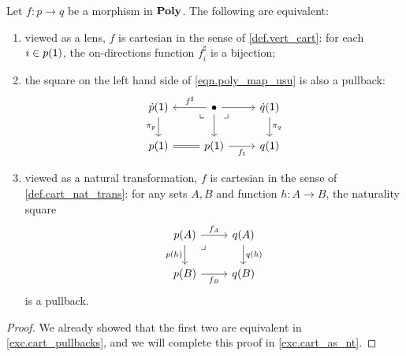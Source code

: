 \documentclass[Book-Poly]{subfiles}
\begin{document}
\begin{proposition}\label{prop.cart_as_nt}
Let $f\colon p\to q$ be a morphism in $\mathbf{Poly}$. The following are equivalent:
	\begin{enumerate}
		\item viewed as a lens, $f$ is cartesian in the sense of \cref{def.vert_cart}: for each $i\in p(\textsf{1})$, the on-directions function $f^\sharp_i$ is a bijection;
		\item the square on the left hand side of \eqref{eqn.poly_map_usu} is also a pullback:
\[
\begin{tikzcd}
	\dot{p}(\1)\ar[d, "\pi_p"']&
	\bullet\ar[l, "f^\sharp"']\ar[r]\ar[d]&
	\dot{q}(\1)\ar[d, "\pi_q"]\\
	p(\1)\ar[r, equal]\ar[ur, phantom, very near end, "\llcorner"]&
	p(\1)\ar[r, "f_\1"']&
	q(\1)\ar[ul, phantom, very near end, "\lrcorner"]
\end{tikzcd}
\]
		\item viewed as a natural transformation, $f$ is cartesian in the sense of \cref{def.cart_nat_trans}: for any sets $A,B$ and function $h\colon A\to B$, the naturality square
\begin{equation} \label{eqn.cart_nt_pullback}
\begin{tikzcd}
	p(A)\ar[r, "f_A"]\ar[d, "p(h)"']&
	q(A)\ar[d, "q(h)"]\\
	p(B)\ar[r, "f_B"']&
	q(B)\ar[ul, phantom, very near end, "\lrcorner"]
\end{tikzcd}
\end{equation}
is a pullback.
  \end{enumerate}
\end{proposition}
\begin{proof}
We already showed that the first two are equivalent in \cref{exc.cart_pullbacks}, and we will complete this proof in \cref{exc.cart_as_nt}.
\end{proof}
\end{document}

